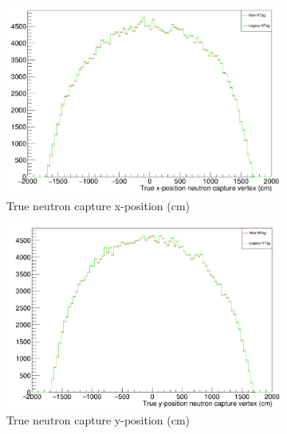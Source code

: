 \begin{figure}
    \centering
     \begin{subfigure}[b]{0.33\linewidth}
      \includegraphics[width=\linewidth]{Figures/TrueNCapXPos.PNG}
      \caption{True neutron capture x-position (cm)}
      \label{fig:TrueNCapXPos} 
     \end{subfigure}%
     \hfill
     \begin{subfigure}[b]{0.33\linewidth}
       \includegraphics[width=\linewidth]{Figures/TrueNCapYpos.PNG}
        \caption{True neutron capture y-position (cm)} 
     \label{fig:TrueNCapYPos}
      \end{subfigure}%
      \hfill
      \begin{subfigure}[b]{0.33\linewidth}

\end{subfigure}
\end{figure}
